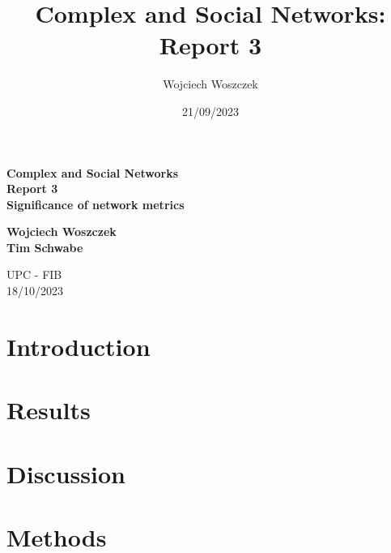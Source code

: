 \documentclass{article}
\title{Complex and Social Networks:\\
Report 3}
\author{Wojciech Woszczek}
\date{21/09/2023}
\begin{document}
\begin{titlepage}
    \begin{center}
        \vspace*{1cm}
            
        \LARGE
        \textbf{Complex and Social Networks\\
Report 3\\
Significance of network metrics}
            
        \vspace{5.5cm}
        \Large
        \textbf{Wojciech Woszczek} \\
        \textbf{Tim Schwabe} 
        
            
        \vspace{0.8cm}
            
        \Large
        UPC - FIB\\
        18/10/2023
            
    \end{center}
\end{titlepage}
\clearpage

\section{Introduction}



\section{Results}



\section{Discussion}



\section{Methods}
\end{document}
